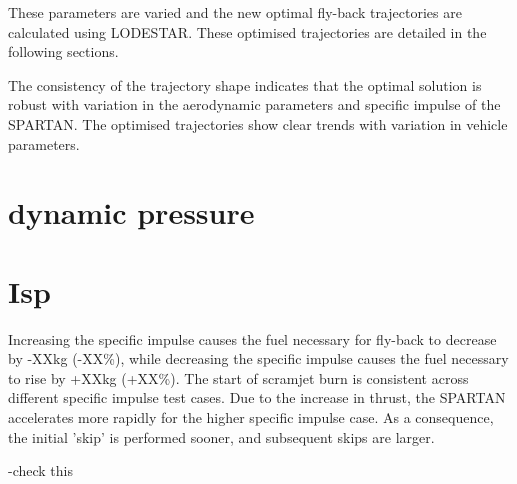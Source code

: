 These parameters are varied and the new optimal fly-back trajectories are calculated using LODESTAR. These optimised trajectories are detailed in the following sections.
 
The consistency of the trajectory shape indicates that the optimal solution is robust with variation in the aerodynamic parameters and specific impulse of the SPARTAN. The optimised trajectories show clear trends with variation in vehicle parameters.






\section{dynamic pressure}



\begin{table}[ht]
\centering

\end{table}


\section{Isp}


Increasing the specific impulse causes the fuel necessary for fly-back to decrease by -XXkg (-XX\%), while decreasing the specific impulse causes the fuel necessary to rise by +XXkg (+XX\%). The start of scramjet burn is consistent across different specific impulse test cases. Due to the increase in thrust, the SPARTAN accelerates more rapidly for the higher specific impulse case. As a consequence, the initial 'skip' is performed sooner, and subsequent skips are larger. 

-check this

